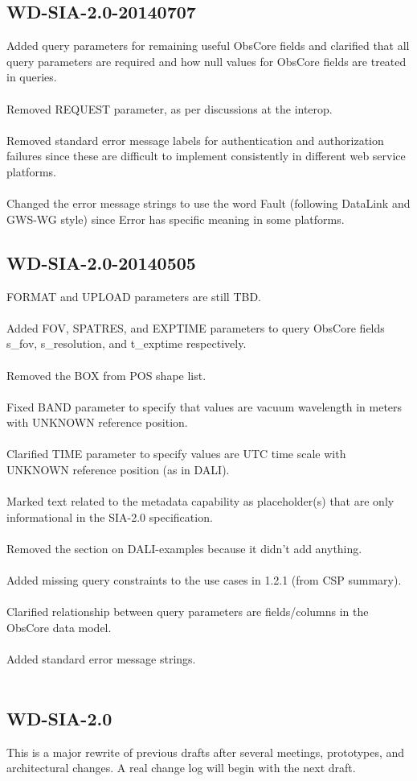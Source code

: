 \documentclass[11pt,a4paper]{ivoa}
\begin{document}
\subsection{WD-SIA-2.0-20140707}
Added query parameters for remaining useful ObsCore fields and clarified that all query parameters are required and how null values for ObsCore fields are treated in queries. \\ \\
Removed REQUEST parameter, as per discussions at the interop. \\ \\
Removed standard error message labels for authentication and authorization failures since these are difficult to implement consistently in different web service platforms.\\ \\ 
Changed the error message strings to use the word Fault (following DataLink and GWS-WG style) since Error has specific meaning in some platforms. 
\subsection{WD-SIA-2.0-20140505}
FORMAT and UPLOAD parameters are still TBD. \\ \\
Added FOV, SPATRES, and EXPTIME parameters to query ObsCore fields s\_fov, s\_resolution, and t\_exptime respectively. \\ \\
Removed the BOX from POS shape list. \\ \\
Fixed BAND parameter to specify that values are vacuum wavelength in meters with UNKNOWN reference position. \\ \\
Clarified TIME parameter to specify values are UTC time scale with UNKNOWN reference position (as in DALI). \\ \\
Marked text related to the {metadata} capability as placeholder(s) that are only informational in the SIA-2.0 specification. \\ \\
Removed the section on DALI-examples because it didn't add anything. \\ \\
Added missing query constraints to the use cases in 1.2.1 (from CSP summary). \\ \\
Clarified relationship between query parameters are fields/columns in the ObsCore data model. \\ \\
Added standard error message strings. \\ \\
\subsection{WD-SIA-2.0}
This is a major rewrite of previous drafts after several meetings, prototypes, and architectural changes. A real change log will begin with the next draft.



\end{document}
